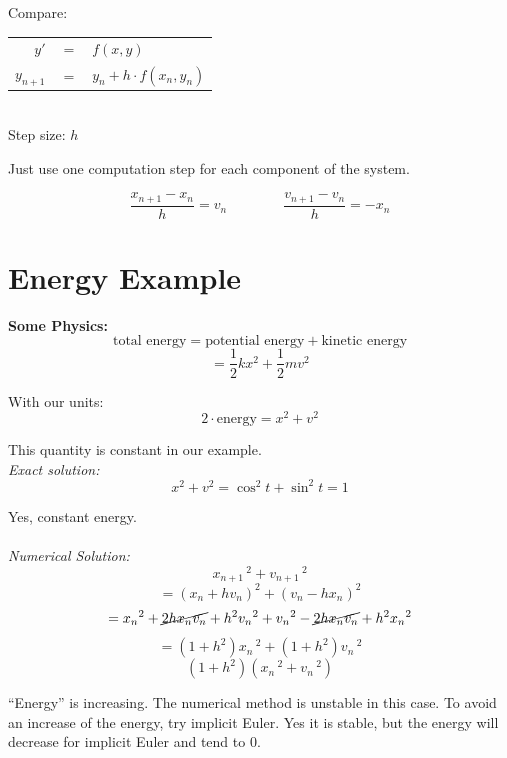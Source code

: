 \documentclass[a4paper,12pt]{report}
\begin{document}
	Compare:
	\begin{center}
		\begin{tabular}{r c l}
			$y \prime$ & $=$ & $f(x,y)$\\
			$y_{n+1}$ & $=$ & $y_n + h \cdot f(x_n, y_n)$
		\end{tabular}\\
		\medskip
		Step size: $h$\\
		\medskip
		\end{center}
		
		Just use one computation step for each component of the system.
		
		\begin{center}

	
	
	
	$$ \frac{x_{n+1} - x_n}{h} = v_n \qquad \qquad \frac{v_{n+1} - v_n}{h} = -x_n$$
	\end{center}
	
	\section{Energy Example}
	\noindent \textbf{Some Physics:}
	$$ \text{total energy} = \text{potential energy} + \text{kinetic energy}$$
	$$= \frac{1}{2}kx^2 + \frac{1}{2}mv^2 $$
	
	\noindent With our units:
	$$ 2 \cdot \text{energy} = x^2 + v^2$$
	
	\noindent This quantity is constant in our example.\\
	
	\textit{Exact solution:}
	$$ x^2 + v^2 = \cos^2 t + \sin^2 t = 1$$
	
	Yes, constant energy.\\ \\
	
	\noindent \textit{Numerical Solution:}
	$$ x_{n+1}\! \,^2 + v_{n+1}\! \,^2$$
	$$ = (x_n + hv_n)^2 + (v_n - hx_n)^2 $$
	$$ = x_n\! \,^2 + \cancel{2hx_nv_n} + h^2v_n\! \,^2 + v_n\! \,^2 -\cancel{2hx_nv_n} +h^2x_n\! \,^2 $$
	$$ = (1+h^2)x_n \! \,^2 +   (1+h^2)v_n \! \,^2 $$
	$$ (1 + h^2)(x_n \! \, ^2 + v_n \! \, ^2) $$
	
	\noindent ``Energy'' is increasing.  The numerical method is unstable in this case. To avoid an increase of the energy,
	try implicit Euler.  Yes it is stable, but the energy will decrease for implicit Euler and tend to 0.\\
	
\end{document}
